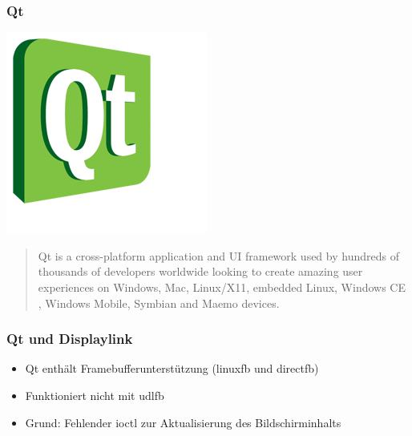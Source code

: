 \documentclass{beamer}
\begin{document}
	\begin{frame}
		\frametitle{Qt}
		\begin{floatingfigure}[l]{1.75cm}
			\includegraphics[scale=0.3]{img/qt-logo}
		\end{floatingfigure}
		\begin{quote}
		Qt is a cross-platform application  and UI framework used by hundreds of thousands of developers worldwide looking to create amazing user experiences  on Windows, Mac, Linux/X11, embedded Linux, Windows CE , Windows Mobile, Symbian  and Maemo devices.
		\end{quote}
	\end{frame}	
	
	\begin{frame}
		\frametitle{Qt und Displaylink}
		\begin{itemize}
			\item Qt enthält Framebufferunterstützung (linuxfb und directfb)
			\item Funktioniert nicht mit udlfb
			\item Grund: Fehlender ioctl zur Aktualisierung des Bildschirminhalts
		\end{itemize}
	\end{frame}
	
\end{document}

